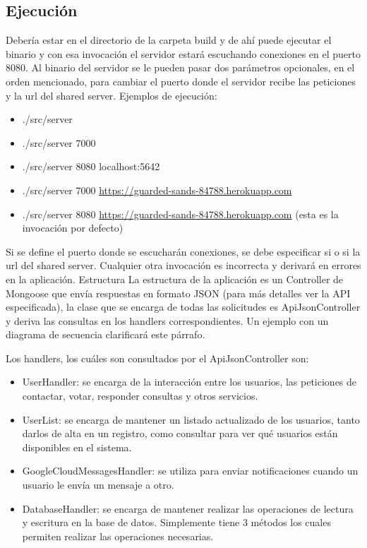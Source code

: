 \documentclass[a4paper,10pt,spanish]{sphinxmanual}
\begin{document}
\subsection{Ejecución}
\label{docTecnica:ejecucion}
Debería estar en el directorio de la carpeta build y de ahí puede ejecutar el binario y con esa invocación el servidor estará escuchando conexiones en el puerto 8080. Al binario del servidor se le pueden pasar dos parámetros opcionales, en el orden mencionado, para cambiar el puerto donde el servidor recibe las peticiones y la url del shared server. Ejemplos de ejecución:
\begin{itemize}
\item {} 
./src/server

\item {} 
./src/server 7000

\item {} 
./src/server 8080 localhost:5642

\item {} 
./src/server 7000 \url{https://guarded-sands-84788.herokuapp.com}

\item {} 
./src/server 8080 \url{https://guarded-sands-84788.herokuapp.com} (esta es la invocación por defecto)

\end{itemize}

Si se define el puerto donde se escucharán conexiones, se debe especificar si o si la url del shared server. Cualquier otra invocación es incorrecta y derivará en errores en la aplicación.
Estructura
La estructura de la aplicación es un Controller de Mongoose que envía respuestas en formato JSON (para más detalles ver la API especificada), la clase que se encarga de todas las solicitudes es ApiJsonController y deriva las consultas en los handlers correspondientes. Un ejemplo con un diagrama de secuencia clarificará este párrafo.

\noindent{}

Los handlers, los cuáles son consultados por el ApiJsonController son:
\begin{itemize}
\item {} 
UserHandler: se encarga de la interacción entre los usuarios, las peticiones de contactar, votar, responder consultas y otros servicios.

\item {} 
UserList: se encarga de mantener un listado actualizado de los usuarios, tanto darlos de alta en un registro, como consultar para ver qué usuarios están disponibles en el sistema.

\item {} 
GoogleCloudMessagesHandler: se utiliza para enviar notificaciones cuando un usuario le envía un mensaje a otro.

\item {} 
DatabaseHandler: se encarga de mantener realizar las operaciones de lectura y escritura en la base de datos. Simplemente tiene 3 métodos los cuales permiten realizar las operaciones necesarias.

\end{itemize}
\end{document}
